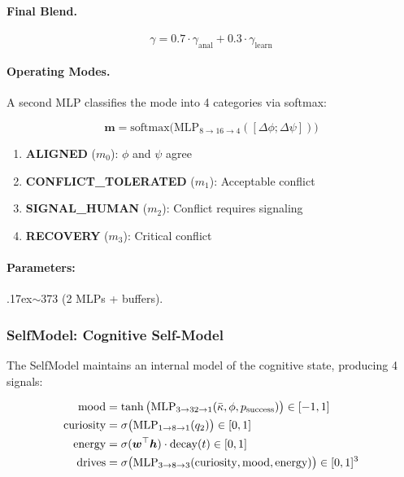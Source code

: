 \paragraph{Final Blend.}
\begin{equation}
    \gamma = 0.7 \cdot \gamma_{\text{anal}} + 0.3 \cdot \gamma_{\text{learn}}
\end{equation}

\paragraph{Operating Modes.}
A second MLP classifies the mode into 4 categories via softmax:

\begin{equation}
    \bm{m} = \text{softmax}\big(\text{MLP}_{8 \to 16 \to 4}([\Delta\phi; \Delta\psi])\big)
\end{equation}

\begin{enumerate}
    \item \textbf{ALIGNED} ($m_0$): $\phi$ and $\psi$ agree
    \item \textbf{CONFLICT\_TOLERATED} ($m_1$): Acceptable conflict
    \item \textbf{SIGNAL\_HUMAN} ($m_2$): Conflict requires signaling
    \item \textbf{RECOVERY} ($m_3$): Critical conflict
\end{enumerate}

\paragraph{Parameters:} {\raise.17ex\hbox{$\scriptstyle\sim$}}373 (2 MLPs + buffers).

\subsubsection{SelfModel: Cognitive Self-Model}
\label{sec:selfmodel}

The SelfModel maintains an internal model of the cognitive state,
producing 4 signals:

\begin{align}
    \text{mood} &= \tanh\big(\text{MLP}_{3 \to 32 \to 1}(\bar{\kappa}, \phi, p_{\text{success}})\big) \in [-1, 1] \\
    \text{curiosity} &= \sigma\big(\text{MLP}_{1 \to 8 \to 1}(q_2)\big) \in [0, 1] \\
    \text{energy} &= \sigma(\bm{w}^\top \bm{h}) \cdot \text{decay}(t) \in [0, 1] \\
    \text{drives} &= \sigma\big(\text{MLP}_{3 \to 8 \to 3}(\text{curiosity}, \text{mood}, \text{energy})\big) \in [0, 1]^3
\end{align}

